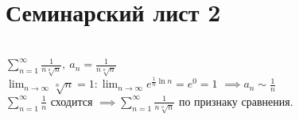 \documentclass[a4paper]{article}
\begin{document}
\section{Семинарский лист 2}
   
    \begin{problem} \ \\[3pt]
        $\displaystyle \sum_{n = 1}^{\infty}\frac{1}{n\sqrt[n]{n}}, \
         a_n = \frac{1}{n\sqrt[n]{n}}$ \\[3pt]
        $\displaystyle \lim_{n \to \infty}{\sqrt[n]{n}} = 1:
         \lim_{n \to \infty}{e^{\frac{1}{n} \ln{n}}} = e^0 = 1$
        $\displaystyle \implies a_n \sim \frac{1}{n}$\\[3pt]
        $\displaystyle \sum_{n = 1}^{\infty}\frac{1}{n}$ сходится 
        $\displaystyle \implies \sum_{n = 1}^{\infty}\frac{1}{n\sqrt[n]{n}}$ 
        по признаку сравнения.
    \end{problem}
\end{document}
